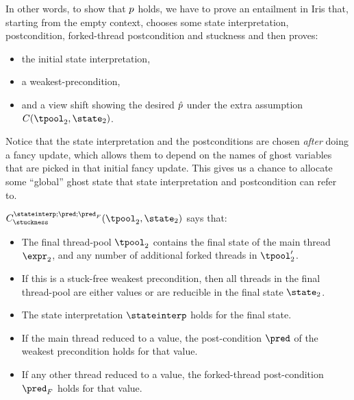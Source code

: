 In other words, to show that $p$ holds, we have to prove an entailment in Iris that, starting from the empty context, chooses some state interpretation, postcondition, forked-thread postcondition and stuckness and then proves:
\begin{itemize}
  \item the initial state interpretation,
  \item a weakest-precondition,
  \item and a view shift showing the desired $\hat{p}$ under the extra assumption $\consstate(\tpool_2, \state_2)$.
\end{itemize}
Notice that the state interpretation and the postconditions are chosen \emph{after} doing a fancy update, which allows them to depend on the names of ghost variables that are picked in that initial fancy update.
This gives us a chance to allocate some ``global'' ghost state that state interpretation and postcondition can refer to.

$\consstate^{\stateinterp;\pred;\pred_F}_{\stuckness}(\tpool_2, \state_2)$ says that:
\begin{itemize}
\item The final thread-pool $\tpool_2$ contains the final state of the main thread $\expr_2$, and any number of additional forked threads in $\tpool_2'$.
\item If this is a stuck-free weakest precondition, then all threads in the final thread-pool are either values or are reducible in the final state $\state_2$.
\item The state interpretation $\stateinterp$ holds for the final state.
\item If the main thread reduced to a value, the post-condition $\pred$ of the weakest precondition holds for that value.
\item If any other thread reduced to a value, the forked-thread post-condition $\pred_F$ holds for that value.
\end{itemize}

~\par

